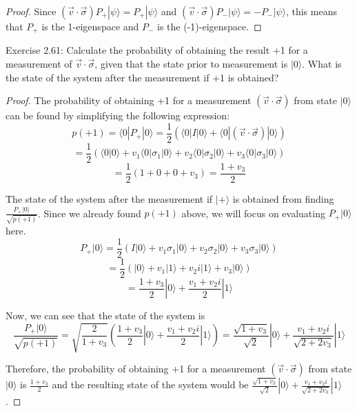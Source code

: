 \begin{proof}
Since \((\vec{v} \cdot \vec{\sigma}) P_+ |\psi\rangle = P_+ |\psi\rangle\) and \((\vec{v} \cdot \vec{\sigma}) P_- |\psi\rangle = - P_- |\psi\rangle\), this means that \(P_+\) is the 1-eigenspace and \(P_-\) is the (-1)-eigenspace.

\end{proof}

\begin{problem}
	Exercise 2.61: Calculate the probability of obtaining the result +1 for a measurement of $\vec{v} \cdot \vec{\sigma}$, given that the state prior to measurement is $|0\rangle$. What is the state of the system after the measurement if +1 is obtained?
\end{problem}
\begin{proof}
	The probability of obtaining +1 for a measurement \((\vec{v} \cdot \vec{\sigma})\) from state \(|0\rangle\) can be found by simplifying the following expression:
\[ p(+1) = \langle 0 | P_+ | 0 \rangle = \frac{1}{2}\left(\langle 0 | I | 0 \rangle + \langle 0 | (\vec{v} \cdot \vec{\sigma}) | 0 \rangle\right) \]
\[ = \frac{1}{2} (\langle 0 | 0 \rangle + v_1 \langle 0 | \sigma_1 | 0 \rangle + v_2 \langle 0 | \sigma_2 | 0 \rangle + v_3 \langle 0 | \sigma_3 | 0 \rangle) \]
\[ = \frac{1}{2}(1 + 0 + 0 + v_3) = \frac{1 + v_3}{2} \]

The state of the system after the measurement if \(|+\rangle\) is obtained from finding \(\frac{P_+|0\rangle}{\sqrt{p(+1)}}\). Since we already found \(p(+1)\) above, we will focus on evaluating \(P_+ |0\rangle\) here.
\[ P_+ |0\rangle = \frac{1}{2}(I |0\rangle + v_1 \sigma_1 |0\rangle + v_2 \sigma_2 |0\rangle + v_3 \sigma_3 |0\rangle) \]
\[ = \frac{1}{2}(|0\rangle + v_1|1\rangle + v_2 i |1\rangle + v_3 |0\rangle) \]
\[ = \frac{1 + v_3}{2}|0\rangle + \frac{v_1 + v_2 i}{2}|1\rangle \]

Now, we can see that the state of the system is
\[ \frac{P_+ |0\rangle}{\sqrt{p(+1)}} = \sqrt{\frac{2}{1 + v_3}} \left(\frac{1 + v_3}{2}|0\rangle + \frac{v_1 + v_2 i}{2}|1\rangle\right) = \frac{\sqrt{1 + v_3}}{\sqrt{2}}|0\rangle + \frac{v_1 + v_2 i}{\sqrt{2 + 2 v_3}}|1\rangle \]

Therefore, the probability of obtaining +1 for a measurement \((\vec{v} \cdot \vec{\sigma})\) from state \(|0\rangle\) is \(\frac{1 + v_3}{2}\) and the resulting state of the system would be \(\frac{\sqrt{1 + v_3}}{\sqrt{2}}|0\rangle + \frac{v_1 + v_2 i}{\sqrt{2 + 2 v_3}}|1\rangle\).
\end{proof}


